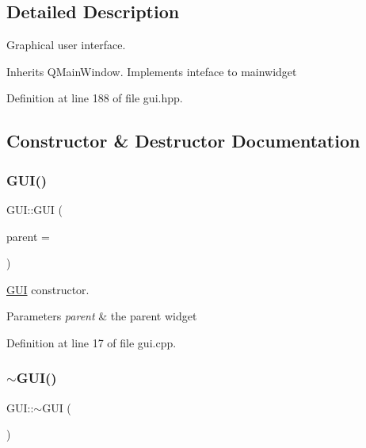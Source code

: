 \subsection{Detailed Description}
Graphical user interface. 

Inherits Q\+Main\+Window. Implements inteface to mainwidget 

Definition at line 188 of file gui.\+hpp.



\subsection{Constructor \& Destructor Documentation}
\mbox{\label{classGUI_acb0ba8c6fc121d814d30560e2c29f2fe}} 
\subsubsection{\texorpdfstring{G\+U\+I()}{GUI()}}
{\footnotesize\ttfamily G\+U\+I\+::\+G\+UI (\begin{DoxyParamCaption}\item[{Q\+Widget $\ast$}]{parent = {} }\end{DoxyParamCaption})}



\mbox{\hyperlink{classGUI}{G\+UI}} constructor. 


\begin{DoxyParams}{Parameters}
{\em parent} & the parent widget \\
\hline
\end{DoxyParams}


Definition at line 17 of file gui.\+cpp.

\mbox{\label{classGUI_ac9cae2328dcb5d83bdfaeca49a2eb695}} 
\subsubsection{\texorpdfstring{$\sim$\+G\+U\+I()}{~GUI()}}
{\footnotesize\ttfamily G\+U\+I\+::$\sim$\+G\+UI (\begin{DoxyParamCaption}{ }\end{DoxyParamCaption})\hspace{0.3cm}{\ttfamily [inline]}}



